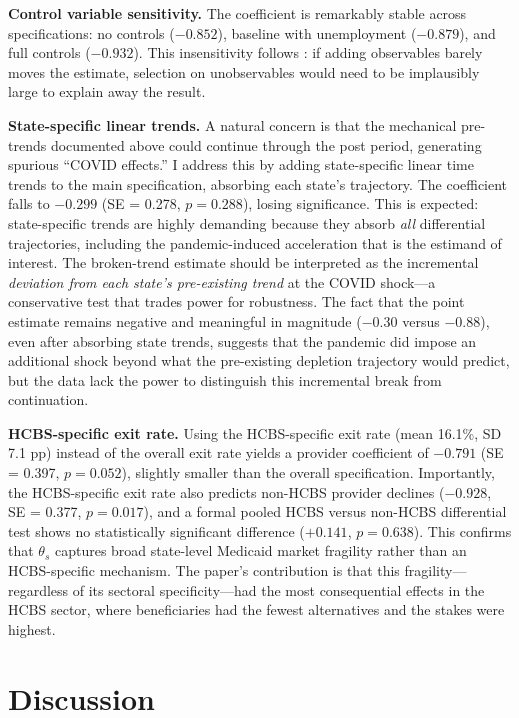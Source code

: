 \documentclass[12pt]{article}
\begin{document}
\textbf{Control variable sensitivity.} The coefficient is remarkably stable across specifications: no controls ($-0.852$), baseline with unemployment ($-0.879$), and full controls ($-0.932$). This insensitivity follows \citet{oster2019}: if adding observables barely moves the estimate, selection on unobservables would need to be implausibly large to explain away the result.

\textbf{State-specific linear trends.} A natural concern is that the mechanical pre-trends documented above could continue through the post period, generating spurious ``COVID effects.'' I address this by adding state-specific linear time trends to the main specification, absorbing each state's trajectory. The coefficient falls to $-0.299$ (SE = 0.278, $p = 0.288$), losing significance. This is expected: state-specific trends are highly demanding because they absorb \emph{all} differential trajectories, including the pandemic-induced acceleration that is the estimand of interest. The broken-trend estimate should be interpreted as the incremental \emph{deviation from each state's pre-existing trend} at the COVID shock---a conservative test that trades power for robustness. The fact that the point estimate remains negative and meaningful in magnitude ($-0.30$ versus $-0.88$), even after absorbing state trends, suggests that the pandemic did impose an additional shock beyond what the pre-existing depletion trajectory would predict, but the data lack the power to distinguish this incremental break from continuation.

\textbf{HCBS-specific exit rate.} Using the HCBS-specific exit rate (mean 16.1\%, SD 7.1 pp) instead of the overall exit rate yields a provider coefficient of $-0.791$ (SE = 0.397, $p = 0.052$), slightly smaller than the overall specification. Importantly, the HCBS-specific exit rate also predicts non-HCBS provider declines ($-0.928$, SE = 0.377, $p = 0.017$), and a formal pooled HCBS versus non-HCBS differential test shows no statistically significant difference ($+0.141$, $p = 0.638$). This confirms that $\theta_s$ captures broad state-level Medicaid market fragility rather than an HCBS-specific mechanism. The paper's contribution is that this fragility---regardless of its sectoral specificity---had the most consequential effects in the HCBS sector, where beneficiaries had the fewest alternatives and the stakes were highest.


\section{Discussion}
\end{document}
